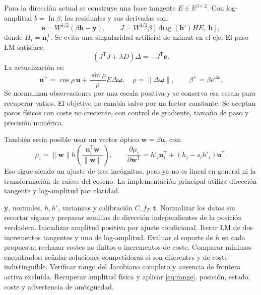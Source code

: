 \documentclass[11pt,a4paper]{article}
\begin{document}
Para la dirección actual se construye una base tangente $E\in\mathbb R^{3\times2}$. Con log-amplitud $b=\ln\beta$, los residuales y sus derivadas son:
\begin{equation}
 \mathbf e=W^{1/2}(\beta\mathbf h-\mathbf y),\qquad
 J=W^{1/2}\beta[\operatorname{diag}(\mathbf h')HE,\ \mathbf h],
\end{equation}
donde $H_i=\mathbf n_i^{\mathsf T}$. Se evita una singularidad artificial de azimut en el eje. El paso LM satisface:
\begin{equation}
 (J^{\mathsf T}J+\lambda D)\Delta=-J^{\mathsf T}\mathbf e.
\end{equation}
La actualización es:
\begin{equation}
 \mathbf u^+=\cos\rho\,\mathbf u+\frac{\sin\rho}{\rho}E\Delta\boldsymbol\omega,
 \quad \rho=\|\Delta\boldsymbol\omega\|,\qquad \beta^+=\beta e^{\Delta b}.
\end{equation}
Se normalizan observaciones por una escala positiva y se conserva esa escala para recuperar vatios. El objetivo no cambia salvo por un factor constante. Se aceptan pasos físicos con coste no creciente, con control de gradiente, tamaño de paso y precisión numérica.

También sería posible usar un vector óptico $\mathbf w=\beta\mathbf u$, con:
\begin{equation}
 \mu_i=\|\mathbf w\|h\left(\frac{\mathbf n_i^{\mathsf T}\mathbf w}{\|\mathbf w\|}\right),\qquad
 \frac{\partial\mu_i}{\partial\mathbf w^{\mathsf T}}=h'_i\mathbf n_i^{\mathsf T}+(h_i-s_i h'_i)\mathbf u^{\mathsf T}.
\end{equation}
Eso sigue siendo un ajuste de tres incógnitas, pero ya no es lineal en general ni la transformación de raíces del coseno. La implementación principal utiliza dirección tangente y log-amplitud por claridad.

\begin{algorithm}[htbp]\caption{NLS conjunto para respuesta calibrada}\begin{algorithmic}[1]
\Require $\mathbf y$, normales, $h,h'$, varianzas y calibración $C,f_T,\mathbf t$.
\State Normalizar los datos sin recortar signos y preparar semillas de dirección independientes de la posición verdadera.
\State Inicializar amplitud positiva por ajuste condicional.
\State Iterar LM de dos incrementos tangentes y uno de log-amplitud.
\State Evaluar el soporte de $h$ en cada propuesta; rechazar costes no finitos o incrementos de coste.
\EndFor
\State Comparar mínimos encontrados; señalar soluciones competidoras si son diferentes y de coste indistinguible.
\State Verificar rango del Jacobiano completo y ausencia de frontera activa excluida.
\State Recuperar amplitud física y aplicar \eqref{eq:range}.
\State \Return posición, estado, coste y advertencia de ambigüedad.
\end{algorithmic}\end{algorithm}
\end{document}
